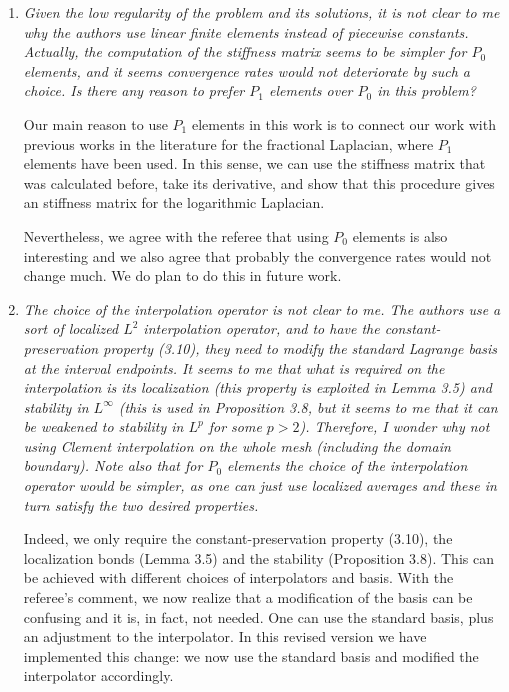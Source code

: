 \documentclass[11 pt]{article}
\numberwithin{equation}{section}
\begin{document}
\begin{enumerate}
    \item \emph{Given the low regularity of the problem and its solutions, it is not clear to me why the authors use linear finite elements instead of piecewise constants. Actually, the computation of the stiffness matrix seems to be simpler for \(P_{0}\) elements, and it seems convergence rates would not deteriorate by such a choice. Is there any reason to prefer \(P_{1}\) elements over \(P_{0}\) in this problem?}

    Our main reason to use $P_1$ elements in this work is to connect our work with previous works in the literature for the fractional Laplacian, where $P_1$ elements have been used. In this sense, we can use the stiffness matrix that was calculated before, take its derivative, and show that this procedure gives an stiffness matrix for the logarithmic Laplacian.

    Nevertheless, we agree with the referee that using $P_0$ elements is also interesting and we also agree that probably the convergence rates would not change much.  We do plan to do this in future work.

    \item \emph{The choice of the interpolation operator is not clear to me. The authors use a sort of localized \(L^{2}\) interpolation operator, and to have the constant-preservation property (3.10), they need to modify the standard Lagrange basis at the interval endpoints. It seems to me that what is required on the interpolation is its localization (this property is exploited in Lemma 3.5) and stability in \(L^{\infty}\) (this is used in Proposition 3.8, but it seems to me that it can be weakened to stability in \(L^{p}\) for some \(p>2\)). Therefore, I wonder why not using Clement interpolation on the whole mesh (including the domain boundary). Note also that for \(P_{0}\) elements the choice of the interpolation operator would be simpler, as one can just use localized averages and these in turn satisfy the two desired properties.}

    Indeed, we only require the constant-preservation property (3.10), the localization bonds (Lemma 3.5) and the stability (Proposition 3.8). This can be achieved with different choices of interpolators and basis. With the referee's comment, we now realize that a modification of the basis can be confusing and it is, in fact, not needed. One can use  the standard basis, plus an adjustment to the interpolator. In this revised version we have implemented this change: we now use the standard basis and modified the interpolator accordingly.


\end{enumerate}
\end{document}
